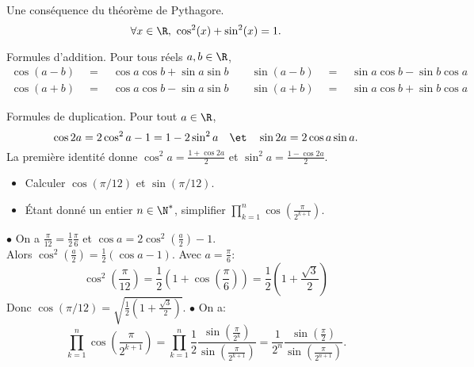 \documentclass[11pt]{article}
\begin{document}
\begin{prop}{Une conséquence du théorème de Pythagore.}{}
    \begin{equation*}
        \forall x \in \R,~\cos^2(x)+\sin^2(x)=1.
    \end{equation*}
\end{prop}

\begin{prop}{Formules d'addition.}{}
    Pour tous réels $a,b\in\R$,
    \begin{align*}
        \cos(a-b)\quad=\quad\cos a\cos b+\sin a\sin b\qquad\sin(a-b)\quad=\quad\sin a\cos b-\sin b\cos a\\
        \cos(a+b)\quad=\quad\cos a\cos b-\sin a\sin b\qquad\sin(a+b)\quad=\quad\sin a\cos b+\sin b\cos a
    \end{align*}
\end{prop}

\begin{corr}{Formules de duplication.}{}
    Pour tout $a\in\R$,
    \begin{equation*}
        \cos2a=2\cos^2a-1=1-2\sin^2a\quad\et\quad\sin2a=2\cos a\sin a.
    \end{equation*}
    La première identité donne $\cos^2a=\frac{1+\cos2a}{2}$ et $\sin^2a=\frac{1-\cos2a}{2}$.
\end{corr}

\begin{ex}{}{}
    \begin{itemize}
        \item Calculer $\cos(\pi/12)$ et $\sin(\pi/12)$.
        \item Étant donné un entier $n\in\N^*$, simplifier $\prod\limits_{k=1}^n\cos\left( \frac{\pi}{2^{k+1}} \right)$.
    \end{itemize}
    \tcblower
    $\bullet$ On a $\frac{\pi}{12}=\frac{1}{2}\frac{\pi}{6}$ et $\cos a=2\cos^2\left( \frac{a}{2} \right)-1$.\\
    Alors $\cos^2\left( \frac{a}{2} \right)=\frac{1}{2}(\cos a-1)$. Avec $a=\frac{\pi}{6}$:
    \begin{equation*}
        \cos^2\left( \frac{\pi}{12} \right)=\frac{1}{2}\left(1+\cos\left( \frac{\pi}{6} \right)\right)=\frac{1}{2}\left( 1+\frac{\sqrt{3}}{2} \right)
    \end{equation*}
    Donc $\cos(\pi/12)=\sqrt{\frac{1}{2}\left( 1+\frac{\sqrt{3}}{2} \right)}$.\n
    $\bullet$ On a:
    \begin{equation*}
        \prod_{k=1}^n\cos\left( \frac{\pi}{2^{k+1}} \right)=\prod_{k=1}^n\frac{1}{2}\frac{\sin\left( \frac{\pi}{2^k} \right)}{\sin\left( \frac{\pi}{2^{k+1}} \right)}=\frac{1}{2^n}\frac{\sin\left( \frac{\pi}{2} \right)}{\sin\left( \frac{\pi}{2^{n+1}} \right)}.
    \end{equation*}
\end{ex}
\end{document}
